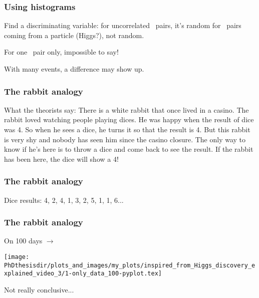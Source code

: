 \begin{frame}
\frametitle{Using histograms}

\manip Find a discriminating variable:
\submanip for uncorrelated \tau\ pairs, it's random
\submanip for \tau\ pairs coming from a particle (Higgs?), not random.

\manip For one \tau\ pair only, impossible to say!

\manip With many events, a difference may show up.
\end{frame}

\begin{frame}
\frametitle{The rabbit analogy}

\manip What the theorists say:
\submanip There is a white rabbit that once lived in a casino.
\submanip The rabbit loved watching people playing dices.
\submanip He was happy when the result of dice was 4.
\submanip So when he sees a dice, he turns it so that the result is 4.
\submanip But this rabbit is very shy and nobody has seen him since the casino closure.
\manip The only way to know if he's here is to throw a dice and come back to see the result.
\submanip If the rabbit has been here, the dice will show a 4!
\end{frame}

\begin{frame}
\frametitle{The rabbit analogy}

\manip Dice results:
4\pause,
2\pause,
4,
1,
3,
2,
5,
1,
1,
6...
\end{frame}

\begin{frame}
\frametitle{The rabbit analogy}
\begin{center}
\begin{minipage}[c]{.29\textwidth}
On \num{100} days $\rightarrow$
\end{minipage}
\begin{minipage}[c]{.4\textwidth}
\vspace{-\baselineskip}
\texttt{[image: \\PhDthesisdir/plots\_and\_images/my\_plots/inspired\_from\_Higgs\_discovery\_explained\_video\_3/1-only\_data\_100-pyplot.tex]}
\end{minipage}
\begin{minipage}[c]{.29\textwidth}
Not really conclusive...
\end{minipage}
\end{center}
\end{frame}


